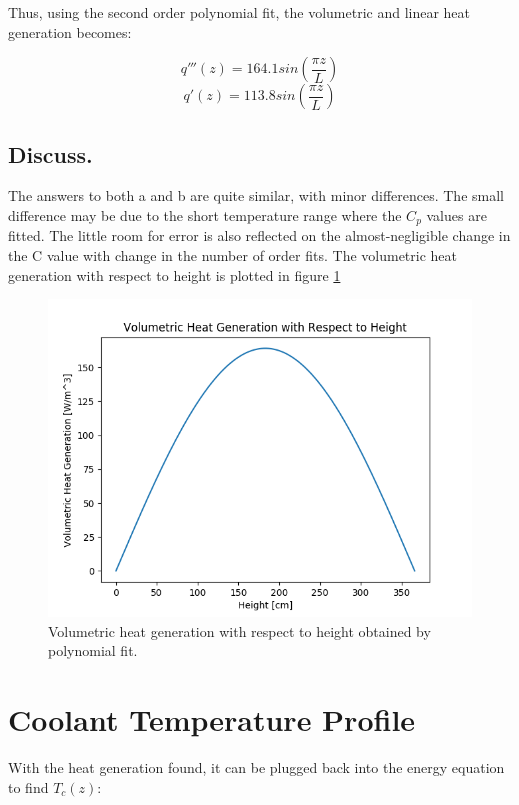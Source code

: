 \documentclass[12pt,letterpaper]{article}
\begin{document}
Thus, using the second order polynomial fit, the volumetric
and linear heat generation becomes:

\[q'''(z) = 164.1 sin(\frac{\pi z}{L})\]
\[q'(z) = 113.8 sin(\frac{\pi z}{L})\]


\subsection*{Discuss.}
The answers to both a and b are quite similar, with minor differences.
The small difference may be due to the short temperature range where
the $C_p$ values are fitted. The little room for error is also reflected
on the almost-negligible change in the C value with change in the number of 
order fits. The volumetric heat generation with respect to height is plotted in
figure \ref{fig:q_vol}

\begin{figure}[htbp!]
    \begin{center}
        \includegraphics[scale=0.7]{q_vol_z.png}
    \end{center}
    \caption{Volumetric heat generation with respect to height obtained by polynomial fit.}
    \label{fig:q_vol}
\end{figure}




\section*{Coolant Temperature Profile}
With the heat generation found, it can be plugged back
into the energy equation to find $T_c(z)$:
\end{document}
